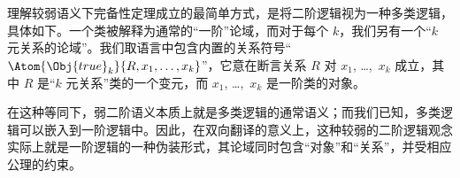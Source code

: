 \documentclass[../../../include/open-logic-section]{subfiles}
\begin{document}
理解较弱语义下完备性定理成立的最简单方式，是将二阶逻辑视为一种多类逻辑，具体如下。一个类被解释为通常的“一阶”论域，而对于每个 $k$，我们另有一个“$k$ 元关系的论域”。我们取语言中包含内置的关系符号“$\Atom{\Obj{true}_k}{R,x_1,\dots,x_k}$”，它意在断言关系 $R$ 对 $x_1$, \dots,~$x_k$ 成立，其中 $R$ 是“$k$ 元关系”类的一个变元，而 $x_1$, \dots,~$x_k$ 是一阶类的对象。

在这种等同下，弱二阶语义本质上就是多类逻辑的通常语义；而我们已知，多类逻辑可以嵌入到一阶逻辑中。因此，在双向翻译的意义上，这种较弱的二阶逻辑观念实际上就是一阶逻辑的一种伪装形式，其论域同时包含“对象”和“关系”，并受相应公理的约束。
\end{document}
